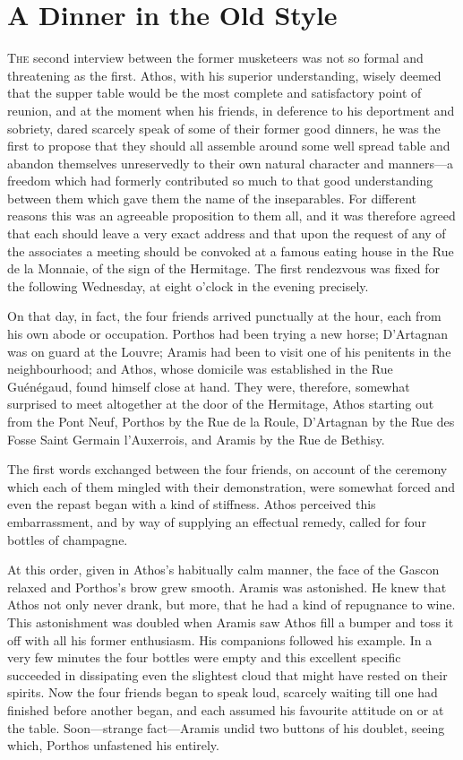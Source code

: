\chapter{A Dinner in the Old Style}

 \lettrine{T}{he} second interview between the former musketeers was not so formal and threatening as the first. Athos, with his superior understanding, wisely deemed that the supper table would be the most complete and satisfactory point of reunion, and at the moment when his friends, in deference to his deportment and sobriety, dared scarcely speak of some of their former good dinners, he was the first to propose that they should all assemble around some well spread table and abandon themselves unreservedly to their own natural character and manners—a freedom which had formerly contributed so much to that good understanding between them which gave them the name of the inseparables. For different reasons this was an agreeable proposition to them all, and it was therefore agreed that each should leave a very exact address and that upon the request of any of the associates a meeting should be convoked at a famous eating house in the Rue de la Monnaie, of the sign of the Hermitage. The first rendezvous was fixed for the following Wednesday, at eight o'clock in the evening precisely.

On that day, in fact, the four friends arrived punctually at the hour, each from his own abode or occupation. Porthos had been trying a new horse; D'Artagnan was on guard at the Louvre; Aramis had been to visit one of his penitents in the neighbourhood; and Athos, whose domicile was established in the Rue Guénégaud, found himself close at hand. They were, therefore, somewhat surprised to meet altogether at the door of the Hermitage, Athos starting out from the Pont Neuf, Porthos by the Rue de la Roule, D'Artagnan by the Rue des Fosse Saint Germain l'Auxerrois, and Aramis by the Rue de Bethisy.

The first words exchanged between the four friends, on account of the ceremony which each of them mingled with their demonstration, were somewhat forced and even the repast began with a kind of stiffness. Athos perceived this embarrassment, and by way of supplying an effectual remedy, called for four bottles of champagne.

At this order, given in Athos's habitually calm manner, the face of the Gascon relaxed and Porthos's brow grew smooth. Aramis was astonished. He knew that Athos not only never drank, but more, that he had a kind of repugnance to wine. This astonishment was doubled when Aramis saw Athos fill a bumper and toss it off with all his former enthusiasm. His companions followed his example. In a very few minutes the four bottles were empty and this excellent specific succeeded in dissipating even the slightest cloud that might have rested on their spirits. Now the four friends began to speak loud, scarcely waiting till one had finished before another began, and each assumed his favourite attitude on or at the table. Soon—strange fact—Aramis undid two buttons of his doublet, seeing which, Porthos unfastened his entirely.

